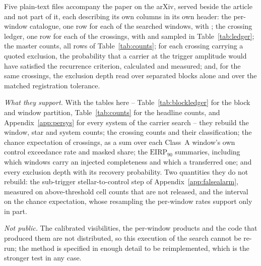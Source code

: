 Five plain-text files accompany the paper on the arXiv, served beside the
article and not part of it, each describing its own columns in its own header:
the per-window catalogue, one row for each of the \NWindows{} searched windows,
with \SiCatColList; the crossing ledger, one row for each of the
\EvNCrossRaw{} crossings, with \SiLdgColList{} and sampled in
Table~\ref{tab:ledger}; the master counts, all
\MtCountRows{} rows of Table~\ref{tab:counts}; for each crossing carrying
a quoted exclusion, the probability that a carrier at the trigger amplitude
would have satisfied the recurrence criterion, calculated and measured; and,
for the same crossings, the exclusion depth read over separated blocks alone
and over the matched registration tolerance.

\emph{What they support.} With the tables here -- Table~\ref{tab:blockledger}
for the block and window partition, Table~\ref{tab:counts} for the headline
counts, and Appendix~\ref{app:persys} for every system of the carrier search
-- they rebuild the window, star
and system counts; the crossing counts and their classification; the chance
expectation of \CeExp{} crossings, as a sum over each Class~A window's own
control exceedance rate and masked share; the $\mathrm{EIRP}_{90}$ summaries,
including which windows carry an injected completeness and which a transferred
one; and every exclusion depth with its recovery probability. Two quantities
they do not rebuild: the sub-trigger stellar-to-control step of
Appendix~\ref{app:falsealarm}, measured on above-threshold cell counts that are
not released, and the interval on the chance expectation, whose resampling the
per-window rates support only in part.

\emph{Not public.} The calibrated visibilities, the per-window products and the
code that produced them are not distributed, so this execution of the search
cannot be re-run; the method is specified in enough detail to be
reimplemented, which is the stronger test in any case.
